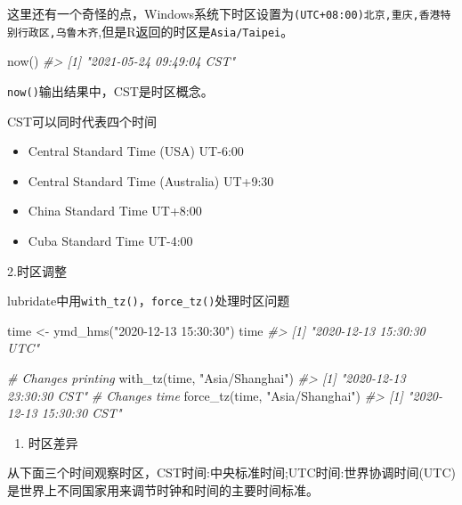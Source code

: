 \documentclass[
]{book}
\newenvironment{Shaded}{\begin{snugshade}}{\end{snugshade}}
\newcommand{\CommentTok}[1]{\textcolor[rgb]{0.56,0.35,0.01}{\textit{#1}}}
\newcommand{\FunctionTok}[1]{\textcolor[rgb]{0.00,0.00,0.00}{#1}}
\newcommand{\NormalTok}[1]{#1}
\newcommand{\OtherTok}[1]{\textcolor[rgb]{0.56,0.35,0.01}{#1}}
\newcommand{\StringTok}[1]{\textcolor[rgb]{0.31,0.60,0.02}{#1}}
\providecommand{\tightlist}{%
  \setlength{\itemsep}{0pt}\setlength{\parskip}{0pt}}
\begin{document}
这里还有一个奇怪的点，Windows系统下时区设置为\texttt{(UTC+08:00)北京,重庆,香港特别行政区,乌鲁木齐},但是R返回的时区是\texttt{Asia/Taipei}。

\begin{Shaded}
\begin{Highlighting}[]
\FunctionTok{now}\NormalTok{()}
\CommentTok{\#\textgreater{} [1] "2021{-}05{-}24 09:49:04 CST"}
\end{Highlighting}
\end{Shaded}

\texttt{now()}输出结果中，CST是时区概念。

CST可以同时代表四个时间

\begin{itemize}
\tightlist
\item
  Central Standard Time (USA) UT-6:00
\item
  Central Standard Time (Australia) UT+9:30
\item
  China Standard Time UT+8:00
\item
  Cuba Standard Time UT-4:00
\end{itemize}

2.时区调整

lubridate中用\texttt{with\_tz()}，\texttt{force\_tz()}处理时区问题

\begin{Shaded}
\begin{Highlighting}[]
\NormalTok{time }\OtherTok{\textless{}{-}} \FunctionTok{ymd\_hms}\NormalTok{(}\StringTok{"2020{-}12{-}13 15:30:30"}\NormalTok{)}
\NormalTok{time}
\CommentTok{\#\textgreater{} [1] "2020{-}12{-}13 15:30:30 UTC"}

\CommentTok{\# Changes printing}
\FunctionTok{with\_tz}\NormalTok{(time, }\StringTok{"Asia/Shanghai"}\NormalTok{)}
\CommentTok{\#\textgreater{} [1] "2020{-}12{-}13 23:30:30 CST"}
\CommentTok{\# Changes time}
\FunctionTok{force\_tz}\NormalTok{(time, }\StringTok{"Asia/Shanghai"}\NormalTok{)}
\CommentTok{\#\textgreater{} [1] "2020{-}12{-}13 15:30:30 CST"}
\end{Highlighting}
\end{Shaded}

\begin{enumerate}
\def\labelenumi{\arabic{enumi}.}
\setcounter{enumi}{2}
\tightlist
\item
  时区差异
\end{enumerate}

从下面三个时间观察时区，CST时间:中央标准时间;UTC时间:世界协调时间(UTC)是世界上不同国家用来调节时钟和时间的主要时间标准。
\end{document}
